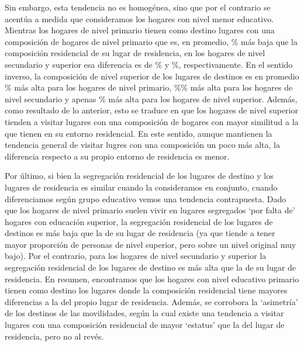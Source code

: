 \documentclass[
  spanish,
  a4paper,%
  chapterprefix=true,%
  DIV=calc,%
  twoside]{scrbook}%
\begin{document}
Sin embargo, esta tendencia no es homogénea, sino que por el contrario
se acentúa a medida que consideramos los hogares con nivel menor
educativo. Mientras los hogares de nivel primario tienen como destino
lugares con una composición de hogares de nivel primario que es, en
promedio, \% más baja que la composición
residencial de su lugar de residencia, en los hogares de nivel
secundario y superior esa diferencia es de \% y
\%, respectivamente. En el sentido inverso, la
composición de nivel superior de los lugares de destinos es en promedio
\% más alta para los hogares de nivel primario,
\%\% más alta para los hogares de nivel secundario
y apenas \% más alta para los hogares de nivel
superior. Además, como resultado de lo anterior, esto se traduce en que
los hogares de nivel superior tienden a visitar lugares con una
composición de hogares con mayor similitud a la que tienen en su entorno
residencial. En este sentido, aunque mantienen la tendencia general de
visitar lugres con una composición un poco más alta, la diferencia
respecto a su propio entorno de residencia es menor.

Por último, si bien la segregación residencial de los lugares de destino
y los lugares de residencia es similar cuando la consideramos en
conjunto, cuando diferenciamos según grupo educativo vemos una tendencia
contrapuesta. Dado que los hogares de nivel primario suelen vivir en
lugares segregados `por falta de' hogares con educación superior, la
segregación residencial de los lugares de destinos es más baja que la de
su lugar de residencia (ya que tiende a tener mayor proporción de
personas de nivel superior, pero sobre un nivel original muy bajo). Por
el contrario, para los hogares de nivel secundario y superior la
segregación residencial de los lugares de destino es más alta que la de
su lugar de residencia. En resumen, encontramos que los hogares con
nivel educativo primario tienen como destino los lugares donde la
composición residencial tiene mayores diferencias a la del propio lugar
de residencia. Además, se corrobora la `asimetría' de los destinos de
las movilidades, según la cual existe una tendencia a visitar lugares
con una composición residencial de mayor `estatus' que la del lugar de
residencia, pero no al revés.
\end{document}
